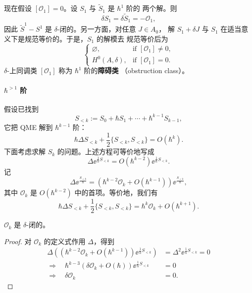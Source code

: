 现在假设 $[\mathcal{O}_1] = 0$。设 $S_1$ 与 $\widetilde{S}_1$ 是 $\hbar^1$ 阶的
两个解。则
\[
  \delta S_1 = \delta\widetilde{S}_1 = -\mathcal{O}_1,
\]
因此 $\widetilde{S}^1 - S^1$ 是 $\delta$-闭的。另一方面，对任意 $J\in A_0$，
解 $S_1 + \delta J$ 与 $S_1$ 在适当意义下是规范等价的。于是，$S_1$ 的解模去
规范等价后为
\[
  \begin{cases}
    \varnothing, & \text{if } [\mathcal{O}_1]\neq 0,\\
    H^0(A,\delta), & \text{if } [\mathcal{O}_1] = 0.
  \end{cases}
\]
$\delta$-上同调类 $[\mathcal{O}_1]$ 称为 $\hbar^1$ 阶的\textbf{障碍类}
（obstruction class）。


\paragraph{$\hbar^{>1}$ 阶}

假设已找到
\[
  S_{<k} := S_0 + \hbar S_1 + \cdots + \hbar^{k-1}S_{k-1},
\]
它把 QME 解到 $\hbar^{k-1}$ 阶：
\[
  \hbar\Delta S_{<k} + \frac{1}{2}\{S_{<k},S_{<k}\} = O(\hbar^k).
\]
下面考虑求解 $S_k$ 的问题。上述方程可等价地写成
\[
  \Delta\ee^{\frac{1}{\hbar}S_{<k}} = O(\hbar^{k-2})\ee^{\frac{1}{\hbar}S_{<k}}.
\]
记
\[
  \Delta\ee^{\frac{S_{<k}}{\hbar}}
  = \left(\hbar^{k-2}\mathcal{O}_k + O(\hbar^{k-1})\right)\ee^{\frac{S_{<k}}{\hbar}},
\]
其中 $\mathcal{O}_k$ 是 $O(\hbar^{k-2})$ 中的首项。等价地，我们有
\[
  \hbar\Delta S_{<k} + \frac{1}{2}\{S_{<k},S_{<k}\}
  = \hbar^k\mathcal{O}_k + O(\hbar^{k+1}).
\]



\begin{wclaim}{}
  $\mathcal{O}_k$ 是 $\delta$-闭的。
\end{wclaim}

\begin{proof}
  对 $\mathcal{O}_k$ 的定义式作用 $\Delta$，得到
  \[
    \begin{aligned}
      \Delta\left(\left(\hbar^{k-2}\mathcal{O}_k + O(\hbar^{k-1})\right)
        \ee^{\frac{1}{\hbar}S_{<k}}\right)
        &= \Delta^2 \ee^{\frac{1}{\hbar}S_{<k}} = 0\\
      \Longrightarrow\quad
      \hbar^{k-3}\left(\delta\mathcal{O}_k + O(\hbar)\right)
        \ee^{\frac{1}{\hbar}S_{<k}} &= 0\\
      \Longrightarrow\quad \delta\mathcal{O}_k &= 0.
    \end{aligned}
  \]
\end{proof}

